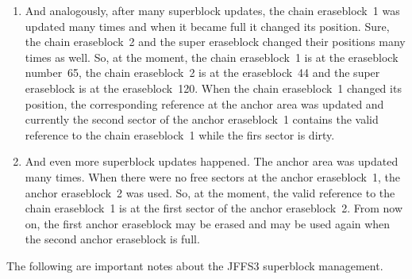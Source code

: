 \begin{enumerate}
\item And analogously, after many superblock updates, the chain eraseblock~1
was updated many times and when it became full it changed its position. Sure,
the chain eraseblock~2 and the super eraseblock changed their positions many
times as well. So, at the moment, the chain eraseblock~1 is at the eraseblock
number~65, the chain eraseblock~2 is at the eraseblock~44 and the super
eraseblock is at the eraseblock~120. When the chain eraseblock~1 changed its
position, the corresponding reference at the anchor area was updated and
currently the second sector of the anchor eraseblock~1 contains the valid
reference to the chain eraseblock~1 while the firs sector is dirty.

\item And even more superblock updates happened. The anchor area was updated
many times. When there were no free sectors at the anchor eraseblock~1, the
anchor eraseblock~2 was used. So, at the moment, the valid reference to the
chain eraseblock~1 is at the first sector of the anchor eraseblock~2. From now
on, the first anchor eraseblock may be erased and may be used again when the
second anchor eraseblock is full.

\end{enumerate}

The following are important notes about the JFFS3 superblock management.


